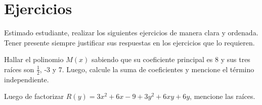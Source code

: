 \section*{Ejercicios}

Estimado estudiante, realizar los siguientes ejercicios de manera clara y ordenada.
Tener presente siempre justificar sus respuestas en los ejercicios que lo requieren.

\begin{exercise}
    Hallar el polinomio $M(x)$ sabiendo que su coeficiente principal es 8 y sus tres raíces son $\frac{1}{2}$, -3 y 7.
    Luego, calcule la suma de coeficientes y mencione el término independiente.
\end{exercise}

\vspace{7cm}

\begin{exercise}
    Luego de factorizar $R(y) = 3x^2 + 6x - 9 + 3y^2 + 6xy + 6y$, mencione las raíces.
\end{exercise}